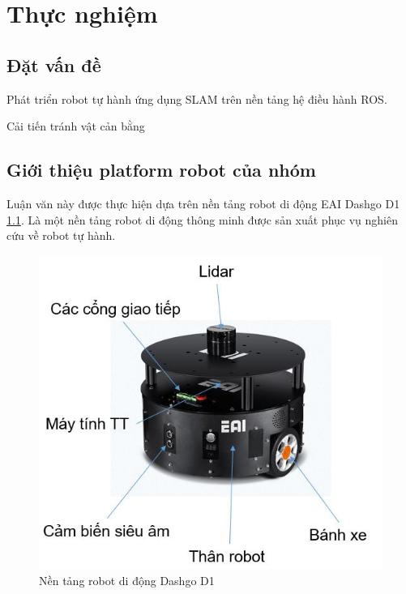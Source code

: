 \chapter{Thực nghiệm}

\section{Đặt vấn đề}

Phát triển robot tự hành ứng dụng SLAM trên nền tảng hệ điều hành ROS.

Cải tiến tránh vật cản bằng


\section{Giới thiệu platform robot của nhóm}
\label{sec:RobotIntro}

Luận văn này được thực hiện dựa trên nền tảng robot di động EAI Dashgo D1 \figurename{\ref{fig:dashgoD1}}. Là một nền tảng robot di động thông minh được sản xuất phục vụ nghiên cứu về robot tự hành. 


\begin{figure}[htp]
	\centering
	\includegraphics[width=0.7\linewidth]{figures/dashgoD1.JPG}
	\caption{Nền tảng robot di động Dashgo D1}
	\label{fig:dashgoD1}
\end{figure}

